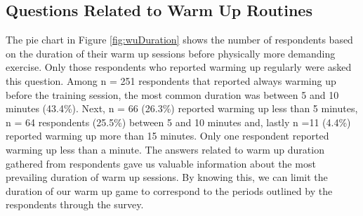 \subsection{Questions Related to Warm Up Routines}
The pie chart in Figure \ref{fig:wuDuration} shows the number of respondents based on the duration of their warm up sessions before physically more demanding exercise. Only those respondents who reported warming up regularly were asked this question. Among n = 251 respondents that reported always warming up before the training session, the most common duration was between 5 and 10 minutes (43.4\%). Next, n = 66 (26.3\%) reported warming up less than 5 minutes, n = 64 respondents (25.5\%) between 5 and 10 minutes and, lastly n =11 (4.4\%) reported warming up more than 15 minutes. Only one respondent reported warming up less than a minute. The answers related to warm up duration gathered from respondents gave us valuable information about the most prevailing duration of warm up sessions. By knowing this, we can limit the duration of our warm up game to correspond to the periods outlined by the respondents through the survey.\\

